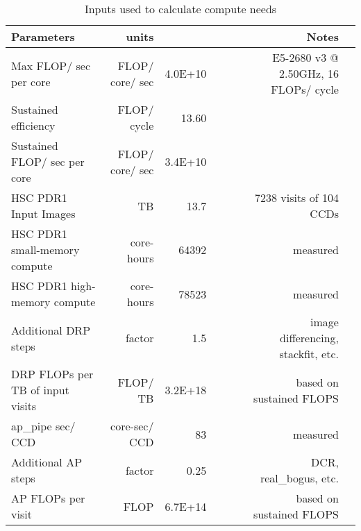 \tiny \begin{longtable} { |p{}  |r  |r  |r  |r  |r  |r  |r |} 
\caption{Inputs used to calculate compute needs \label{tab:computeSizing}}\\ 
\hline 
{Parameters}&{units}&{}&{}&{}&{}&{Notes} \\ \hline
{Max FLOP/ sec per core}&{FLOP/ core/ sec}&{4.0E+10}&{}&{}&{}&{E5-2680 v3 @ 2.50GHz, 16 FLOPs/ cycle} \\ \hline
{Sustained efficiency}&{FLOP/ cycle}&{13.60}&&&& \\ \hline
{Sustained FLOP/ sec per core}&{FLOP/ core/ sec}&{3.4E+10}&&&& \\ \hline
{HSC PDR1 Input Images}&{TB}&{13.7}&{}&{}&{}&{7238 visits of 104 CCDs} \\ \hline
{HSC PDR1 small-memory compute}&{core-hours}&{64392}&{}&{}&{}&{measured} \\ \hline
{HSC PDR1 high-memory compute}&{core-hours}&{78523}&{}&{}&{}&{measured} \\ \hline
{Additional DRP steps}&{factor}&{1.5}&{}&{}&{}&{image differencing, stackfit, etc.} \\ \hline
{DRP FLOPs per TB of input visits}&{FLOP/ TB}&{3.2E+18}&{}&{}&{}&{based on sustained FLOPS} \\ \hline
{ap\_pipe sec/ CCD}&{core-sec/ CCD}&{83}&{}&{}&{}&{measured} \\ \hline
{Additional AP steps}&{factor}&{0.25}&{}&{}&{}&{DCR, real\_bogus, etc.} \\ \hline
{AP FLOPs per visit}&{FLOP}&{6.7E+14}&{}&{}&{}&{based on sustained FLOPS} \\ \hline
\end{longtable} \normalsize
